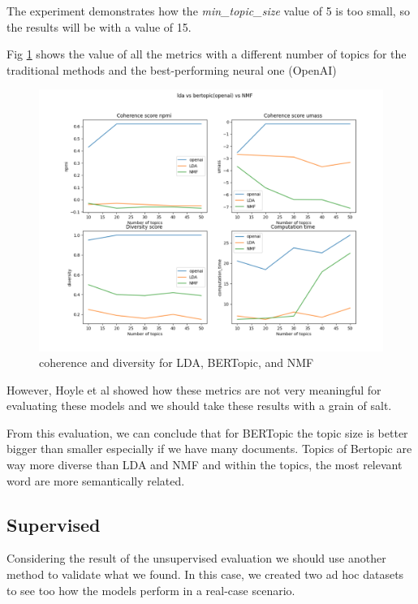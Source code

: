 The experiment demonstrates how the \textit{min\_topic\_size} value of 5 is too small, so the results will be with a value of 15.

Fig \ref{figure:unsupervised_results} shows the value of all the metrics with a different number of topics for the traditional methods and the best-performing neural one (OpenAI)

\begin{figure}[h]
    \centering %
        \includegraphics[width=0.99\linewidth]{Chapter4/figures/topic_unsupervised.png} 
    \caption{coherence and diversity for LDA, BERTopic, and NMF
    }
    \label{figure:unsupervised_results} %
\end{figure}


However, Hoyle et al  \cite{hoyle_is_2021} showed how these metrics are not very meaningful for evaluating these models and we should take these results with a grain of salt.

From this evaluation, we can conclude that for BERTopic the topic size is better bigger than smaller especially if we have many documents. Topics of Bertopic are way more diverse than LDA and NMF and within the topics, the most relevant word are more semantically related.


\subsection{Supervised}
Considering the result of the unsupervised evaluation we should use another method to validate what we found. In this case, we created two ad hoc datasets to see too how the models perform in a real-case scenario.

